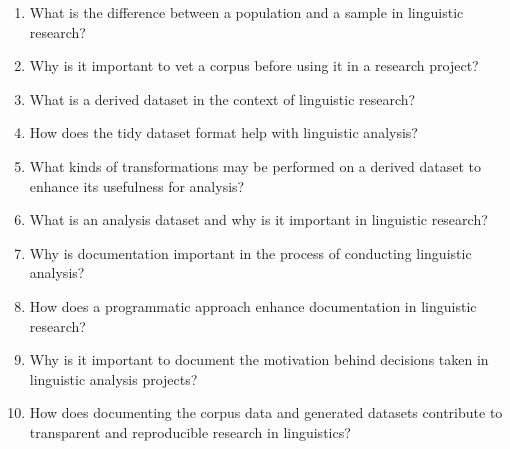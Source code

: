 \documentclass[
  letterpaper,
]{scrbook}
\providecommand{\tightlist}{%
  \setlength{\itemsep}{0pt}\setlength{\parskip}{0pt}}\usepackage{longtable,booktabs,array}
\begin{document}
\begin{tcolorbox}[enhanced jigsaw, title=\textcolor{quarto-callout-note-color}{\faInfo}\hspace{0.5em}{Conceptual questions}, titlerule=0mm, toptitle=1mm, colbacktitle=quarto-callout-note-color!10!white, bottomtitle=1mm, left=2mm, colframe=quarto-callout-note-color-frame, breakable, toprule=.15mm, colback=white, opacitybacktitle=0.6, leftrule=.75mm, rightrule=.15mm, bottomrule=.15mm, arc=.35mm, coltitle=black, opacityback=0]

\begin{enumerate}
\def\labelenumi{\arabic{enumi}.}
\tightlist
\item
  What is the difference between a population and a sample in linguistic
  research?
\item
  Why is it important to vet a corpus before using it in a research
  project?
\item
  What is a derived dataset in the context of linguistic research?
\item
  How does the tidy dataset format help with linguistic analysis?
\item
  What kinds of transformations may be performed on a derived dataset to
  enhance its usefulness for analysis?
\item
  What is an analysis dataset and why is it important in linguistic
  research?
\item
  Why is documentation important in the process of conducting linguistic
  analysis?
\item
  How does a programmatic approach enhance documentation in linguistic
  research?
\item
  Why is it important to document the motivation behind decisions taken
  in linguistic analysis projects?
\item
  How does documenting the corpus data and generated datasets contribute
  to transparent and reproducible research in linguistics?
\end{enumerate}

\end{tcolorbox}
\end{document}

